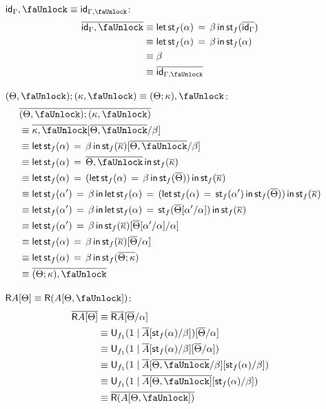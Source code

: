 \documentclass[10pt]{article}
\theoremstyle{definition}
\newcommand{\id}{\mathsf{id}}
\newcommand\U[3]{\ensuremath{\mathsf{U}_{#1}(#2 \mid #3)}}
\newcommand\StI[2]{\ensuremath{\mathsf{st}_{#1}(#2)}}
\newcommand\StE[4]{\ensuremath{\mathsf{let} \, \StI{#1}{#3} \, = \, {#2} \, \mathsf{in} \, #4}}
\newcommand{\upstairs}[1]{\overline{#1}}
\newcommand{\lock}{\text{\faUnlock}}
\newcommand{\Rtype}[1]{\mathsf{R}{#1}}
\begin{document}
\begin{enumerate}[style = multiline, labelwidth = 80pt]
\item[{$\id_\Gamma , \lock \equiv \id_{\Gamma, \lock}$}:]
\begin{align*}
\upstairs{\id_\Gamma , \lock} 
&\equiv \StE{f}{\beta}{\alpha}{\StI{f}{\upstairs{\id_\Gamma}}} \\ 
&\equiv \StE{f}{\beta}{\alpha}{\StI{f}{\alpha}} \\ 
&\equiv \beta \\
&\equiv \upstairs{\id_{\Gamma , \lock}} 
\end{align*}
\item[{$(\Theta, \lock) ; (\kappa, \lock) \equiv (\Theta ; \kappa), \lock$}:] 
\begin{align*}
&\upstairs{(\Theta, \lock) ; (\kappa, \lock)} \\
&\equiv \upstairs{\kappa, \lock}[\upstairs{\Theta, \lock}/\beta] \\
&\equiv \StE{f}{\beta}{\alpha}{\StI{f}{\upstairs{\kappa}}}[\upstairs{\Theta, \lock}/\beta] \\
&\equiv \StE{f}{\upstairs{\Theta, \lock}}{\alpha}{\StI{f}{\upstairs{\kappa}}} \\
&\equiv \StE{f}{(\StE{f}{\beta}{\alpha}{\StI{f}{\upstairs{\Theta}}})}{\alpha}{\StI{f}{\upstairs{\kappa}}} \\
&\equiv \StE{f}{\beta}{\alpha'}{\StE{f}{(\StE{f}{\StI{f}{\alpha'}}{\alpha}{\StI{f}{\upstairs{\Theta}}})}{\alpha}{\StI{f}{\upstairs{\kappa}}}} \\
&\equiv \StE{f}{\beta}{\alpha'}{\StE{f}{\StI{f}{\upstairs{\Theta}[\alpha'/\alpha]}}{\alpha}{\StI{f}{\upstairs{\kappa}}}} \\
&\equiv \StE{f}{\beta}{\alpha'}{\StI{f}{\upstairs{\kappa}}[\upstairs{\Theta}[\alpha'/\alpha]/\alpha]} \\
&\equiv \StE{f}{\beta}{\alpha}{\StI{f}{\upstairs{\kappa}}[\upstairs{\Theta}/\alpha]} \\
&\equiv \StE{f}{\beta}{\alpha}{\StI{f}{\upstairs{\Theta;\kappa}}} \\
&\equiv \upstairs{(\Theta;\kappa), \lock}
\end{align*}

\item[{$\Rtype{A}[\Theta] \equiv \Rtype{(A[\Theta, \lock])}$}:] 
\begin{align*}
\upstairs{\Rtype{A}[\Theta]}
&\equiv \upstairs{\Rtype{A}}[\upstairs{\Theta}/\alpha] \\
&\equiv \U{f_1}{1}{\upstairs{A}[\StI{f}{\alpha}/\beta]}[\upstairs{\Theta}/\alpha] \\
&\equiv \U{f_1}{1}{\upstairs{A}[\StI{f}{\alpha}/\beta][\upstairs{\Theta}/\alpha]} \\
&\equiv \U{f_1}{1}{\upstairs{A}[\upstairs{\Theta, \lock}/\beta][\StI{f}{\alpha}/\beta]} \\
&\equiv \U{f_1}{1}{\upstairs{A[\Theta, \lock]}[\StI{f}{\alpha}/\beta]} \\
&\equiv \upstairs{\Rtype{(A[\Theta, \lock])}} 
\end{align*}


\end{enumerate}
\end{document}

